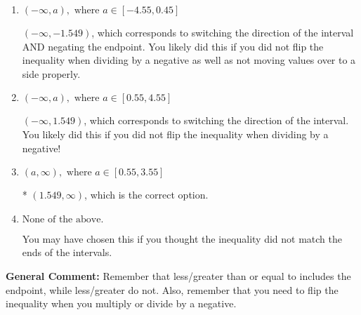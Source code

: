 \documentclass{extbook}[14pt]
\begin{document}
\begin{enumerate}
{\begin{enumerate}[label=\Alph*.]
 $(-1.549, \infty)$, which corresponds to negating the endpoint of the solution.
\item \( (-\infty, a), \text{ where } a \in [-4.55, 0.45] \)

 $(-\infty, -1.549)$, which corresponds to switching the direction of the interval AND negating the endpoint. You likely did this if you did not flip the inequality when dividing by a negative as well as not moving values over to a side properly.
\item \( (-\infty, a), \text{ where } a \in [0.55, 4.55] \)

 $(-\infty, 1.549)$, which corresponds to switching the direction of the interval. You likely did this if you did not flip the inequality when dividing by a negative!
\item \( (a, \infty), \text{ where } a \in [0.55, 3.55] \)

* $(1.549, \infty)$, which is the correct option.
\item \( \text{None of the above}. \)

You may have chosen this if you thought the inequality did not match the ends of the intervals.
\end{enumerate}

\textbf{General Comment:} Remember that less/greater than or equal to includes the endpoint, while less/greater do not. Also, remember that you need to flip the inequality when you multiply or divide by a negative.
}
\end{enumerate}
\end{document}

